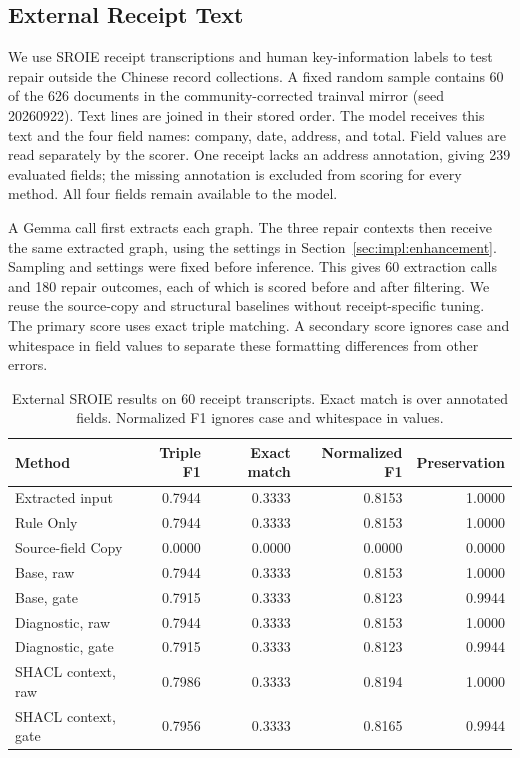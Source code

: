 \subsection{External Receipt Text}
\label{sec:eval:external_receipts}

We use SROIE receipt transcriptions and human key-information labels
\citep{ref_sroie2019} to test repair outside the Chinese record collections.
A fixed random sample contains 60 of the 626 documents in the
community-corrected trainval mirror (seed 20260922). Text lines are joined
in their stored order. The model receives this text and the four field
names: company, date, address, and total. Field values are read separately
by the scorer. One receipt lacks an address annotation, giving 239 evaluated
fields; the missing annotation is excluded from scoring for every method.
All four fields remain available to the model.

A Gemma call first extracts each graph. The three repair contexts then
receive the same extracted graph, using the settings in
Section~\ref{sec:impl:enhancement}. Sampling and settings were fixed before
inference. This gives 60 extraction calls and 180 repair outcomes, each of
which is scored before and after filtering. We reuse the source-copy and
structural baselines without receipt-specific tuning. The primary score
uses exact triple matching. A secondary score ignores case and whitespace
in field values to separate these formatting differences from other errors.

\begin{table}[t]
\centering
\caption{External SROIE results on 60 receipt transcripts. Exact match is over
annotated fields. Normalized F1 ignores case and whitespace in values.}
\label{tab:external_receipts}
\small
\begin{tabular}{lrrrr}
\toprule
Method & Triple F1 & Exact match & Normalized F1 & Preservation \\
\midrule
Extracted input & 0.7944 & 0.3333 & 0.8153 & 1.0000 \\
Rule Only & 0.7944 & 0.3333 & 0.8153 & 1.0000 \\
Source-field Copy & 0.0000 & 0.0000 & 0.0000 & 0.0000 \\
Base, raw & 0.7944 & 0.3333 & 0.8153 & 1.0000 \\
Base, gate & 0.7915 & 0.3333 & 0.8123 & 0.9944 \\
Diagnostic, raw & 0.7944 & 0.3333 & 0.8153 & 1.0000 \\
Diagnostic, gate & 0.7915 & 0.3333 & 0.8123 & 0.9944 \\
SHACL context, raw & 0.7986 & 0.3333 & 0.8194 & 1.0000 \\
SHACL context, gate & 0.7956 & 0.3333 & 0.8165 & 0.9944 \\
\bottomrule
\end{tabular}
\end{table}

